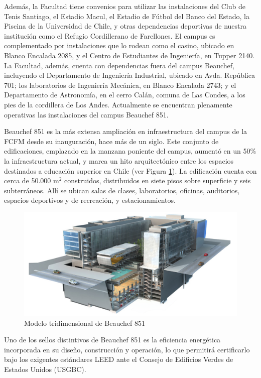 Además, la Facultad tiene convenios para utilizar las instalaciones del Club de Tenis Santiago,
el Estadio Macul, el Estadio de Fútbol del Banco del Estado, la Piscina de la Universidad de Chile,
y otras dependencias deportivas de nuestra institución como el Refugio Cordillerano de Farellones.
El campus es complementado por instalaciones que lo rodean como el casino, ubicado en Blanco
Encalada 2085, y el Centro de Estudiantes de Ingeniería, en Tupper 2140.
La Facultad, además, cuenta con dependencias fuera del campus Beauchef, incluyendo el
Departamento de Ingeniería Industrial, ubicado en Avda. República 701; los laboratorios de
Ingeniería Mecánica, en Blanco Encalada 2743; y el Departamento de Astronomía, en el cerro
Calán, comuna de Las Condes, a los pies de la cordillera de Los Andes. Actualmente se encuentran
plenamente operativas las instalaciones del campus Beauchef 851.

Beauchef 851 es la más extensa ampliación en infraestructura del campus de la
FCFM desde su inauguración, hace más de un siglo. Este conjunto de edificaciones, emplazado
en la manzana poniente del campus, aumentó en un 50\% la infraestructura actual, y marca un hito
arquitectónico entre los espacios destinados a educación superior en Chile (ver Figura \ref{b851}). La
edificación cuenta con cerca de 50.000 m$^2$ construidos, distribuidos en siete pisos sobre superficie
y seis subterráneos. Allí se ubican salas de clases, laboratorios, oficinas, auditorios, espacios
deportivos y de recreación, y estacionamientos.

\begin{figure}[ht!]
\centering
\includegraphics[width=\columnwidth]{./pictures/beauchef851.png}
\caption{Modelo tridimensional de Beauchef 851}
\label{b851}
\end{figure}

Uno de los sellos distintivos de Beauchef 851 es la eficiencia energética incorporada en su
diseño, construcción y operación, lo que permitirá certificarlo bajo los exigentes estándares LEED
ante el Consejo de Edificios Verdes de Estados Unidos (USGBC).

